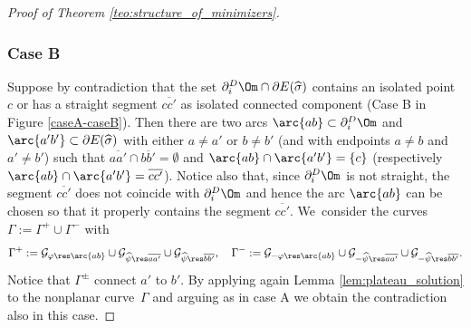 \begin{proof}[Proof of Theorem \ref{teo:structure_of_minimizers}]
\subsubsection*{Case B} Suppose by contradiction that the set $\partial_i^D\Om\cap\partial E(\widehat\sigma)$ contains an isolated point $c$ or has a straight segment $\overline{cc'}$ as isolated connected component (Case B in Figure \ref{caseA-caseB}).
Then there are two arcs $\arc{ab}\subset\partial_i^D\Om$ and $\arc{a'b'}\subset\partial E(\widehat\sigma)$ with either $a\neq a'$ or $b\neq b'$ (and with endpoints $a\ne b$ and $a'\ne b'$) such that $\overline{aa'}\cap\overline{bb'}=\emptyset$ and $\arc{ab}\cap\arc{a'b'}=\{c\}$ (respectively $\arc{ab}\cap\arc{a'b'}=\overline{cc'}$). Notice also that, since $\partial_i^D\Om$ is not straight, the segment $\overline{cc'}$ does not coincide with $\partial_i^D\Om$ and hence the arc $\arc{ab}$ can be chosen so that it properly contains the segment $\overline{cc'}$. We~consider the curves $\Gamma:=\Gamma^+\cup\Gamma^-$ with
\begin{equation}\label{eq:gamma}
\Gamma^+:=\mathcal{G}_{\varphi\res\arc{ab}}
\cup\mathcal{G}_{\widehat\psi\res\overline{aa'}}\cup\mathcal{G}_{\widehat\psi\res\overline{bb'}}
,\quad
\Gamma^-:=\mathcal{G}_{-\varphi\res\arc{ab}}
\cup\mathcal{G}_{-\widehat\psi\res\overline{aa'}}
\cup\mathcal{G}_{-\widehat\psi\res\overline{bb'}}.
\end{equation}
Notice that $\Gamma^\pm$ connect $a'$ to $b'$.
By applying again Lemma \ref{lem:plateau_solution} to the nonplanar curve~$\Gamma$ and arguing as in case A we obtain the contradiction also in this case.


\end{proof}
